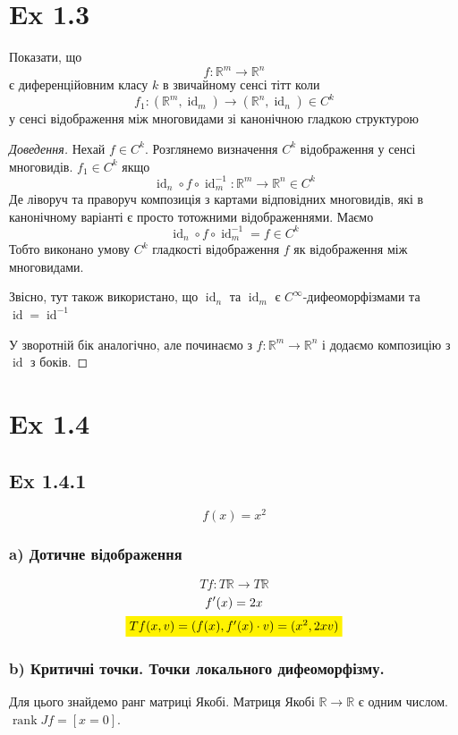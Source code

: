 \documentclass[10pt, a4paper]{article} %
\newcommand{\R}{\mathbb{R}}
\DeclareMathOperator{\id}{id}
\DeclareMathOperator{\rank}{rank}
\begin{document}
\section*{Ex 1.3}
\begin{mdframed}
    Показати, що 
    \[f : \R^m \to \R^n\]
    є диференційовним класу $k$ в звичайному сенсі тітт коли 
    \[f_1: (\R^m, \id_m) \to (\R^n, \id_n) \in C^k\]
    у сенсі відображення між многовидами зі канонічною гладкою структурою
\end{mdframed}

\begin{proof}[Доведення]
    Нехай $f \in C^k$.
    Розглянемо визначення $C^k$ відображення у сенсі многовидів. $f_1 \in C^k$ якщо
    \[\id_n \circ f \circ \id_m^{-1} : \R^m \to \R^n \in C^k \]
    Де ліворуч та праворуч композиція з картами відповідних многовидів, які в канонічному варіанті є просто тотожними відображеннями.
    Маємо
    \[\id_n \circ f \circ \id_m^{-1} = f \in C^k\]
    Тобто виконано умову $C^k$ гладкості відображення $f$ як відображення між многовидами.

    Звісно, тут також використано, що $\id_n$ та $\id_m$ є $C^\infty$-дифеоморфізмами та $\id = \id^{-1}$

    У зворотній бік аналогічно, але починаємо з $f : \R^m \to \R^n$ і додаємо композицію з $\id$ з боків.
\end{proof}

\section*{Ex 1.4}
\subsection*{Ex 1.4.1}
\begin{mdframed}
    \[f(x) = x^2\]
\end{mdframed}

\subsubsection*{a) Дотичне відображення}
\[Tf : T\R \to T\R\]
\begin{gather*}
    f'(x) = 2x\\
    \colorbox{yellow}{$Tf(x,v) = (f(x), f'(x)\cdot v) = (x^2, 2xv)$}
\end{gather*}

\subsubsection*{b) Критичні точки. Точки локального дифеоморфізму.}
Для цього знайдемо ранг матриці Якобі.
Матриця Якобі $\R\to\R$ є одним числом. $\rank Jf = [x=0]$.
\end{document}
